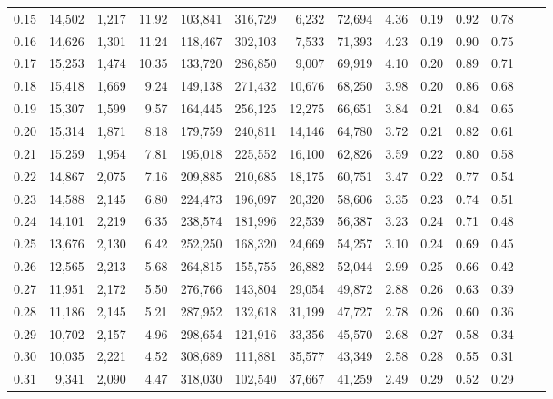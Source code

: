 \begin{tabular}{rrrrrrrrrrrrrr}
0.15 &  14,502 &  1,217 &   11.92 &  103,841 &  316,729 &   6,232 &  72,694 &  4.36 &  0.19 &  0.92 &      0.78 \\
0.16 &  14,626 &  1,301 &   11.24 &  118,467 &  302,103 &   7,533 &  71,393 &  4.23 &  0.19 &  0.90 &      0.75 \\
0.17 &  15,253 &  1,474 &   10.35 &  133,720 &  286,850 &   9,007 &  69,919 &  4.10 &  0.20 &  0.89 &      0.71 \\
0.18 &  15,418 &  1,669 &    9.24 &  149,138 &  271,432 &  10,676 &  68,250 &  3.98 &  0.20 &  0.86 &      0.68 \\
0.19 &  15,307 &  1,599 &    9.57 &  164,445 &  256,125 &  12,275 &  66,651 &  3.84 &  0.21 &  0.84 &      0.65 \\
0.20 &  15,314 &  1,871 &    8.18 &  179,759 &  240,811 &  14,146 &  64,780 &  3.72 &  0.21 &  0.82 &      0.61 \\
0.21 &  15,259 &  1,954 &    7.81 &  195,018 &  225,552 &  16,100 &  62,826 &  3.59 &  0.22 &  0.80 &      0.58 \\
0.22 &  14,867 &  2,075 &    7.16 &  209,885 &  210,685 &  18,175 &  60,751 &  3.47 &  0.22 &  0.77 &      0.54 \\
0.23 &  14,588 &  2,145 &    6.80 &  224,473 &  196,097 &  20,320 &  58,606 &  3.35 &  0.23 &  0.74 &      0.51 \\
0.24 &  14,101 &  2,219 &    6.35 &  238,574 &  181,996 &  22,539 &  56,387 &  3.23 &  0.24 &  0.71 &      0.48 \\
0.25 &  13,676 &  2,130 &    6.42 &  252,250 &  168,320 &  24,669 &  54,257 &  3.10 &  0.24 &  0.69 &      0.45 \\
0.26 &  12,565 &  2,213 &    5.68 &  264,815 &  155,755 &  26,882 &  52,044 &  2.99 &  0.25 &  0.66 &      0.42 \\
0.27 &  11,951 &  2,172 &    5.50 &  276,766 &  143,804 &  29,054 &  49,872 &  2.88 &  0.26 &  0.63 &      0.39 \\
0.28 &  11,186 &  2,145 &    5.21 &  287,952 &  132,618 &  31,199 &  47,727 &  2.78 &  0.26 &  0.60 &      0.36 \\
0.29 &  10,702 &  2,157 &    4.96 &  298,654 &  121,916 &  33,356 &  45,570 &  2.68 &  0.27 &  0.58 &      0.34 \\
0.30 &  10,035 &  2,221 &    4.52 &  308,689 &  111,881 &  35,577 &  43,349 &  2.58 &  0.28 &  0.55 &      0.31 \\
0.31 &   9,341 &  2,090 &    4.47 &  318,030 &  102,540 &  37,667 &  41,259 &  2.49 &  0.29 &  0.52 &      0.29 \\

\end{tabular}

